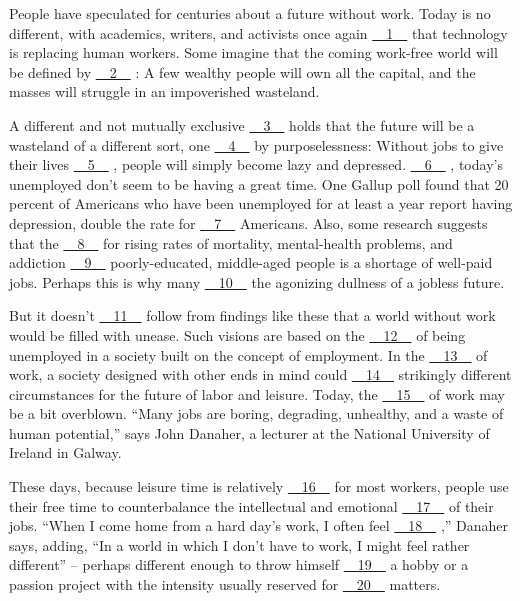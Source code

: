 People have speculated for centuries about a future without work. Today is no different, with academics, writers, and activists once again \uline{~~1~~} that technology is replacing human workers. Some imagine that the coming work-free world will be defined by \uline{~~2~~} : A few wealthy people will own all the capital, and the masses will struggle in an impoverished wasteland.


A different and not mutually exclusive \uline{~~3~~} holds that the future will be a wasteland of a different sort, one \uline{~~4~~} by purposelessness: Without jobs to give their lives \uline{~~5~~} , people will simply become lazy and depressed. \uline{~~6~~} , today's unemployed don't seem to be having a great time. One Gallup poll found that 20 percent of Americans who have been unemployed for at least a year report having depression, double the rate for \uline{~~7~~} Americans. Also, some research suggests that the \uline{~~8~~} for rising rates of mortality, mental-health problems, and addiction \uline{~~9~~} poorly-educated, middle-aged people is a shortage of well-paid jobs. Perhaps this is why many \uline{~~10~~} the agonizing dullness of a jobless future.


But it doesn't \uline{~~11~~} follow from findings like these that a world without work would be filled with unease. Such visions are based on the \uline{~~12~~} of being unemployed in a society built on the concept of employment. In the \uline{~~13~~} of work, a society designed with other ends in mind could \uline{~~14~~} strikingly different circumstances for the future of labor and leisure. Today, the \uline{~~15~~} of work may be a bit overblown. ``Many jobs are boring, degrading, unhealthy, and a waste of human potential,'' says John Danaher, a lecturer at the National University of Ireland in Galway.


These days, because leisure time is relatively \uline{~~16~~} for most workers, people use their free time to counterbalance the intellectual and emotional \uline{~~17~~} of their jobs. ``When I come home from a hard day's work, I often feel \uline{~~18~~} ,'' Danaher says, adding, ``In a world in which I don't have to work, I might feel rather different'' – perhaps different enough to throw himself \uline{~~19~~} a hobby or a passion project with the intensity usually reserved for \uline{~~20~~} matters.